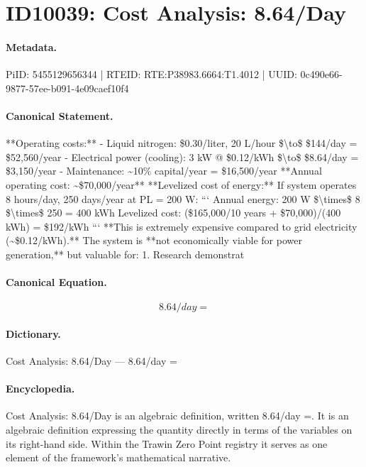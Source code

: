 \section*{ID10039: Cost Analysis: 8.64/Day}
\paragraph{Metadata.}
PiID: 5455129656344 | RTEID: RTE:P38983.6664:T1.4012 | UUID: 0c490e66-9877-57ee-b091-4e09caef10f4

\paragraph{Canonical Statement.}
**Operating costs:** - Liquid nitrogen: \$0.30/liter, 20 L/hour \$\textbackslash{}to\$ \$144/day = \$52,560/year - Electrical power (cooling): 3 kW @ \$0.12/kWh \$\textbackslash{}to\$ \$8.64/day = \$3,150/year - Maintenance: \textasciitilde{}10\% capital/year = \$16,500/year **Annual operating cost: \textasciitilde{}\$70,000/year** **Levelized cost of energy:** If system operates 8 hours/day, 250 days/year at PL = 200 W: ``` Annual energy: 200 W \$\textbackslash{}times\$ 8 \$\textbackslash{}times\$ 250 = 400 kWh Levelized cost: (\$165,000/10 years + \$70,000)/(400 kWh) = \$192/kWh ``` **This is extremely expensive compared to grid electricity (\textasciitilde{}\$0.12/kWh).** The system is **not economically viable for power generation,** but valuable for: 1. Research demonstrat

\paragraph{Canonical Equation.}
\[
8.64/day =
\]

\paragraph{Dictionary.}
Cost Analysis: 8.64/Day — 8.64/day =

\paragraph{Encyclopedia.}
Cost Analysis: 8.64/Day is an algebraic definition, written 8.64/day =. It is an algebraic definition expressing the quantity directly in terms of the variables on its right-hand side. Within the Trawin Zero Point registry it serves as one element of the framework's mathematical narrative.
